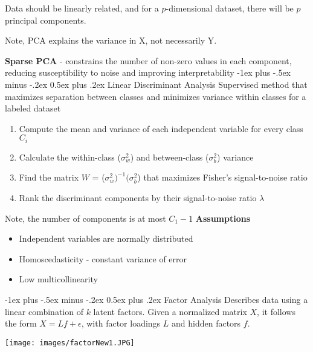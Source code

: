 \documentclass[10pt,landscape]{article}
\makeatletter
\renewcommand{\subsection}{\@startsection{subsection}{2}{0mm}%
                                {-1ex plus -.5ex minus -.2ex}%
                                {0.5ex plus .2ex}%
                                {\normalfont\normalsize\bfseries}}
\makeatother
\begin{document}
\begin{multicols}{3}
Data should be linearly related, and for a $p$-dimensional dataset, there will be $p$ principal components.

Note, PCA explains the variance in X, not necessarily Y.

\textbf{Sparse PCA} - constrains the number of non-zero values in each component, reducing susceptibility to noise and improving interpretability
\subsection{Linear Discriminant Analysis}
Supervised method that maximizes separation between classes and minimizes variance within classes for a labeled dataset
\begin{enumerate}[leftmargin=5mm]
\itemsep -.4mm
\item Compute the mean and variance of each independent variable for every class $C_i$
\item Calculate the within-class ($\sigma_w^2$) and between-class ($\sigma_b^2$) variance
\item Find the matrix $W$ = ($\sigma_w^2)^{-1}(\sigma_b^2$) that maximizes Fisher's signal-to-noise ratio
\item Rank the discriminant components by their signal-to-noise ratio $\lambda$
\end{enumerate}
Note, the number of components is at most $C_1 - 1$
\textbf{Assumptions}
\vspace{-.7mm}
\begin{itemize}[label={--},leftmargin=4mm]
\itemsep -.4mm
\item Independent variables are normally distributed
\item Homoscedasticity - constant variance of error
\item Low multicollinearity
\end{itemize}


\subsection{Factor Analysis}
Describes data using a linear combination of $k$ latent factors.
Given a normalized matrix $X$, it follows the form  $X = Lf + \epsilon$,  with factor loadings $L$ and hidden factors $f$.
\vspace{-1mm}
\begin{center}
    \texttt{[image: images/factorNew1.JPG]}
\end{center}
\vspace{-2mm}


\end{multicols}
\end{document}
